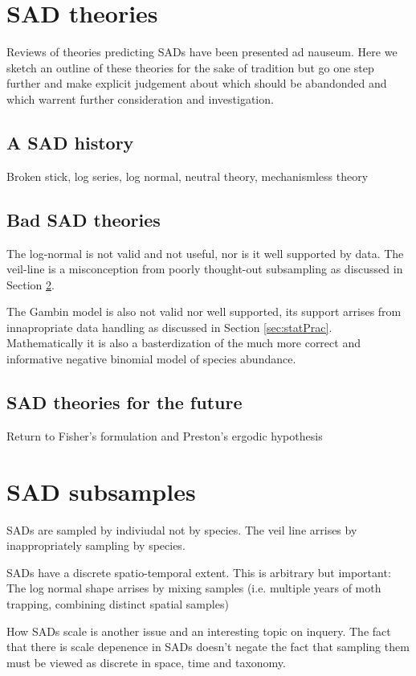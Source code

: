 \documentclass[12pt]{article}
\begin{document}
\section{SAD theories}
Reviews of theories predicting SADs have been presented ad
nauseum. Here we sketch an outline of these theories for the sake of
tradition but go one step further and make explicit judgement about
which should be abandonded and which warrent further consideration and
investigation.

\subsection{A SAD history}
Broken stick, log series, log normal, neutral theory, mechanismless
theory

\subsection{Bad SAD theories}
The log-normal is not valid and not useful, nor is it well supported
by data. The veil-line is a misconception from poorly thought-out
subsampling as discussed in Section \ref{sec:samp}.

The Gambin model is also not valid nor well supported, its support
arrises from innapropriate data handling as discussed in Section
\ref{sec:statPrac}. Mathematically it is also a basterdization of the
much more correct and informative negative binomial model of species
abundance.

\subsection{SAD theories for the future}
Return to Fisher's formulation and Preston's ergodic hypothesis


\section{SAD subsamples}
\label{sec:samp}

SADs are sampled by indiviudal not by species. The veil line arrises
by inappropriately sampling by species.

SADs have a discrete spatio-temporal extent. This is arbitrary but
important: The log normal shape arrises by mixing samples
(i.e. multiple years of moth trapping, combining distinct spatial
samples)

How SADs scale is another issue and an interesting topic on inquery.
The fact that there is scale depenence in SADs doesn't negate the fact
that sampling them must be viewed as discrete in space, time and
taxonomy.
\end{document}
